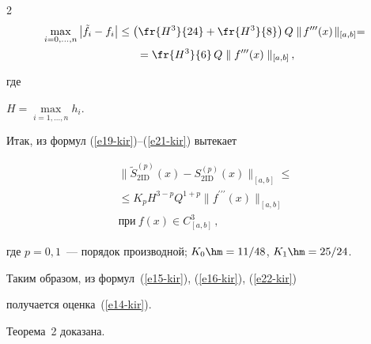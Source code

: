\begin{multicols}{2}
\begin{align}
 & \max\limits_{i=0,\ldots , n} \left\vert \tilde{f}_i -f_i\right\vert \leq  \left( 


\fr{H^3}{24} + \fr{H^3}{8}\right) Q \parallel \!f^{\prime\prime\prime}(x)\!\parallel_{[a,b]} = {}\notag\\


&\hspace*{30mm}{}=\fr{H^3}{6}\,Q\parallel f^{\prime\prime\prime}(x)\parallel_{[a,b]}\,,


  \label{e21-kir}


  \end{align}


где 


$H=\max\limits_{i=1,\ldots , n} h_i$.


  


  Итак, из формул (\ref{e19-kir})--(\ref{e21-kir}) вытекает


  \begin{multline}


\parallel\! \tilde{S}_{2\mathrm{ID}}^{(p)} (x) -S_{2\mathrm{ID}}^{(p)}(x)\!\parallel_{[a,b]}\leq {}\\


{}\leq K_p 


H^{3-p} Q^{1+p} \parallel\! f^{\prime\prime\prime} (x)\!\parallel_{[a,b]}\\ 


\mbox{при}\ f(x)\in C^3_{[a,b]}\,,


  \label{e22-kir}


  \end{multline}


где $p=0, 1$~--- порядок производной; $K_0\hm= {11}/{48}$, $K_1\hm= 


{25}/{24}$.


  


  Таким образом, из формул~(\ref{e15-kir}), (\ref{e16-kir}), (\ref{e22-kir}) 


получается оценка~(\ref{e14-kir}). 








  


  Теорема~2 доказана.


  


  \medskip


  



\end{multicols}
